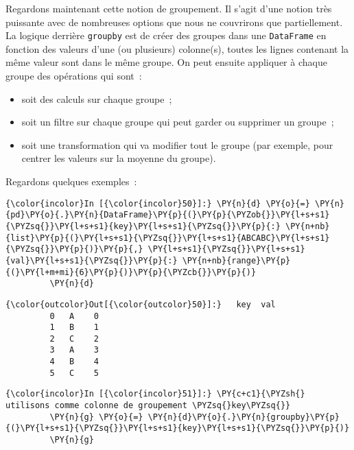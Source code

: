     Regardons maintenant cette notion de groupement. Il s'agit d'une notion
très puissante avec de nombreuses options que nous ne couvrirons que
partiellement. La logique derrière \texttt{groupby} est de créer des
groupes dans une \texttt{DataFrame} en fonction des valeurs d'une (ou
plusieurs) colonne(s), toutes les lignes contenant la même valeur sont
dans le même groupe. On peut ensuite appliquer à chaque groupe des
opérations qui sont~:

\begin{itemize}
\tightlist
\item
  soit des calculs sur chaque groupe~;
\item
  soit un filtre sur chaque groupe qui peut garder ou supprimer un
  groupe~;
\item
  soit une transformation qui va modifier tout le groupe (par exemple,
  pour centrer les valeurs sur la moyenne du groupe).
\end{itemize}

Regardons quelques exemples~:

    \begin{Verbatim}[commandchars=\\\{\}]
{\color{incolor}In [{\color{incolor}50}]:} \PY{n}{d} \PY{o}{=} \PY{n}{pd}\PY{o}{.}\PY{n}{DataFrame}\PY{p}{(}\PY{p}{\PYZob{}}\PY{l+s+s1}{\PYZsq{}}\PY{l+s+s1}{key}\PY{l+s+s1}{\PYZsq{}}\PY{p}{:} \PY{n+nb}{list}\PY{p}{(}\PY{l+s+s1}{\PYZsq{}}\PY{l+s+s1}{ABCABC}\PY{l+s+s1}{\PYZsq{}}\PY{p}{)}\PY{p}{,} \PY{l+s+s1}{\PYZsq{}}\PY{l+s+s1}{val}\PY{l+s+s1}{\PYZsq{}}\PY{p}{:} \PY{n+nb}{range}\PY{p}{(}\PY{l+m+mi}{6}\PY{p}{)}\PY{p}{\PYZcb{}}\PY{p}{)}
         \PY{n}{d}
\end{Verbatim}


\begin{Verbatim}[commandchars=\\\{\}]
{\color{outcolor}Out[{\color{outcolor}50}]:}   key  val
         0   A    0
         1   B    1
         2   C    2
         3   A    3
         4   B    4
         5   C    5
\end{Verbatim}
            
    \begin{Verbatim}[commandchars=\\\{\}]
{\color{incolor}In [{\color{incolor}51}]:} \PY{c+c1}{\PYZsh{} utilisons comme colonne de groupement \PYZsq{}key\PYZsq{}}
         \PY{n}{g} \PY{o}{=} \PY{n}{d}\PY{o}{.}\PY{n}{groupby}\PY{p}{(}\PY{l+s+s1}{\PYZsq{}}\PY{l+s+s1}{key}\PY{l+s+s1}{\PYZsq{}}\PY{p}{)}
         \PY{n}{g}
\end{Verbatim}


